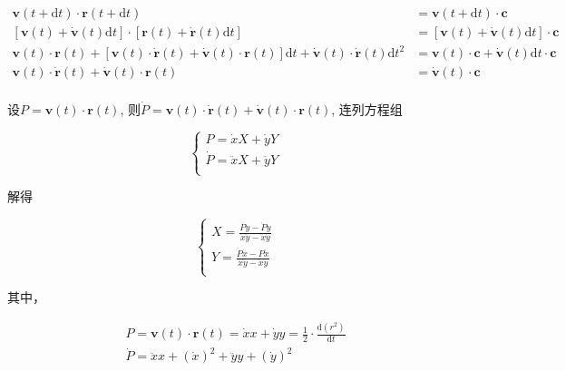 \documentclass{article}
\begin{document}
$$
\begin{aligned}
	\mathbf{v}\left( t+\mathrm{d}t \right) \cdot \mathbf{r}\left( t+\mathrm{d}t \right) &=\mathbf{v}\left( t+\mathrm{d}t \right) \cdot \mathbf{c}\\
	\left[ \mathbf{v}\left( t \right) +\dot{\mathbf{v}}\left( t \right) \mathrm{d}t \right] \cdot \left[ \mathbf{r}\left( t \right) +\dot{\mathbf{r}}\left( t \right) \mathrm{d}t \right] &=\left[ \mathbf{v}\left( t \right) +\dot{\mathbf{v}}\left( t \right) \mathrm{d}t \right] \cdot \mathbf{c}\\
	\mathbf{v}\left( t \right) \cdot \mathbf{r}\left( t \right) +\left[ \mathbf{v}\left( t \right) \cdot \dot{\mathbf{r}}\left( t \right) +\dot{\mathbf{v}}\left( t \right) \cdot \mathbf{r}\left( t \right) \right] \mathrm{d}t+\dot{\mathbf{v}}\left( t \right) \cdot \dot{\mathbf{r}}\left( t \right) \mathrm{d}t^2&=\mathbf{v}\left( t \right) \cdot \mathbf{c}+\dot{\mathbf{v}}\left( t \right) \mathrm{d}t\cdot \mathbf{c}\\
	\mathbf{v}\left( t \right) \cdot \dot{\mathbf{r}}\left( t \right) +\dot{\mathbf{v}}\left( t \right) \cdot \mathbf{r}\left( t \right) &=\dot{\mathbf{v}}\left( t \right) \cdot \mathbf{c}\\
\end{aligned}
$$

设$P=\mathbf{v}\left( t \right) \cdot \mathbf{r}\left( t \right)$, 则$\dot{P}=\mathbf{v}\left( t \right) \cdot \dot{\mathbf{r}}\left( t \right) +\dot{\mathbf{v}}\left( t \right) \cdot \mathbf{r}\left( t \right) 
$, 连列方程组

$$
\begin{cases}
	P=\dot{x}X+\dot{y}Y\\
	\dot{P}=\ddot{x}X+\ddot{y}Y\\
\end{cases}
$$

解得

$$
\begin{cases}
	X=\frac{P\ddot{y}-\dot{P}\dot{y}}{\dot{x}\ddot{y}-\ddot{x}\dot{y}}\\
	Y=\frac{\dot{P}\dot{x}-P\ddot{x}}{\dot{x}\ddot{y}-\ddot{x}\dot{y}}\\
\end{cases}
$$

其中，

$$
\begin{array}{l}
	P=\mathbf{v}\left( t \right) \cdot \mathbf{r}\left( t \right) =\dot{x}x+\dot{y}y=\frac{1}{2}\cdot \frac{\mathrm{d}\left( r^2 \right)}{\mathrm{d}t}\\
	\dot{P}=\ddot{x}x+\left( \dot{x} \right) ^2+\ddot{y}y+\left( \dot{y} \right) ^2\\
\end{array}
$$
\end{document}
